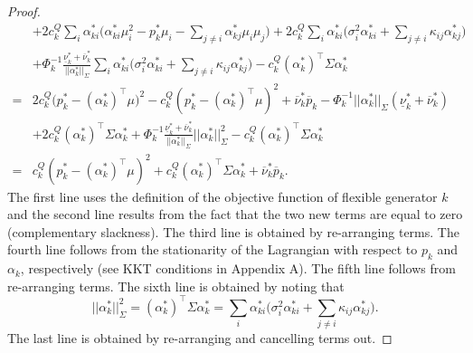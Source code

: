 \documentclass{article}
\begin{document}
\begin{proof}
\begin{align*}
    &+ 2c_k^Q \sum_i \alpha_{ki}^*\big(\alpha_{ki}^*\mu_i^2 - p_k^* \mu_i - \sum_{j \ne i} \alpha_{kj}^* \mu_i \mu_j)  + 2c_k^Q \sum_i \alpha_{ki}^* \big(\sigma_i^2 \alpha_{ki}^* + \sum_{j \ne i} \kappa_{ij} \alpha_{kj}^*\big)\\
    &+ \Phi_k^{-1}\frac{\underline{\nu}_k^* +\overline{\nu}_k^*}{||\alpha_k^*||_\Sigma} \sum_i \alpha_{ki}^*\big(\sigma_i^2 \alpha_{ki}^* + \sum_{j \ne i} \kappa_{ij} \alpha_{kj}^*\big) - c_k^Q (\alpha_k^*)^\top\Sigma \alpha_k^*\\
    =& 2c_k^Q\big(p_k^* - (\alpha_k^*)^\top \mu\big)^2 - c_k^Q(p_k^* - (\alpha_k^*)^\top \mu)^2 + \overline{\nu}_k^* \overline{p}_k - \Phi_k^{-1}||\alpha_k^*||_{\Sigma} (\underline{\nu}_k^* + \overline{\nu}_k^*)\\ 
    &+ 2c_k^Q (\alpha_{k}^*)^\top \Sigma \alpha_k^* + \Phi_k^{-1}\frac{\underline{\nu}_k^* +\overline{\nu}_k^*}{||\alpha_k^*||_\Sigma} ||\alpha_k^*||_\Sigma^2 - c_k^Q (\alpha_k^*)^\top\Sigma \alpha_k^*\\
    =& c_k^Q(p_k^* - (\alpha_k^*)^\top \mu)^2 + c_k^Q (\alpha_k^*)^\top \Sigma \alpha_k^* + \overline{\nu}_k^* \overline{p}_k.
\end{align*}
The first line uses the definition of the objective function of flexible generator $k$ and the second line results from the fact that the two new terms are equal to zero (complementary slackness). The third line is obtained by re-arranging terms. The fourth line follows from the stationarity of the Lagrangian with respect to $p_k$ and $\alpha_k$, respectively (see KKT conditions in Appendix A). The fifth line follows from re-arranging terms. The sixth line is obtained by noting that
\begin{equation*}
||\alpha_k^*||_\Sigma^2 = (\alpha_k^*)^\top \Sigma \alpha_k^* = \sum_i \alpha_{ki}^*\big(\sigma_i^2 \alpha_{ki}^* + \sum_{j \ne i} \kappa_{ij} \alpha_{kj}^*\big).
\end{equation*}
The last line is obtained by re-arranging and cancelling terms out.
\end{proof}
\end{document}
